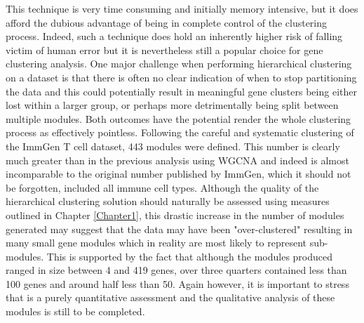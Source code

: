 This technique is very time consuming and initially memory intensive, but it does afford the dubious advantage of being in complete control of the clustering process. Indeed, such a technique does hold an inherently higher risk of falling victim of human error but it is nevertheless still a popular choice for gene clustering analysis. One major challenge when performing hierarchical clustering on a dataset is that there is often no clear indication of when to stop partitioning the data and this could potentially result in meaningful gene clusters being either lost within a larger group, or perhaps more detrimentally being split between multiple modules. Both outcomes have the potential render the whole clustering process as effectively pointless. Following the careful and systematic clustering of the ImmGen T cell dataset, 443 modules were defined. This number is clearly much greater than in the previous analysis using WGCNA and indeed is almost incomparable to the original number published by ImmGen, which it should not be forgotten, included all immune cell types. Although the quality of the hierarchical clustering solution should naturally be assessed using measures outlined in Chapter \ref{Chapter1}, this drastic increase in the number of modules generated may suggest that the data may have been "over-clustered" resulting in many small gene modules which in reality are most likely to represent sub-modules. This is supported by the fact that although the modules produced ranged in size between 4 and 419 genes, over three quarters contained less than 100 genes and around half less than 50. Again however, it is important to stress that is a purely quantitative assessment and the qualitative analysis of these modules is still to be completed.  



